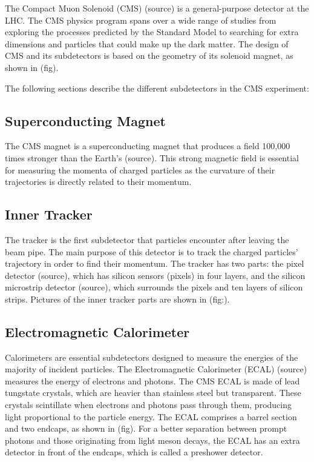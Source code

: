 The Compact Muon Solenoid (CMS) (source) is a general-purpose detector at the LHC. The CMS physics program spans over a wide range of studies from exploring the processes predicted by the Standard Model to searching for extra dimensions and particles that could make up the dark matter. The design of CMS and its subdetectors is based on the geometry of its solenoid magnet, as shown in (fig).

The following sections describe the different subdetectors in the CMS experiment:


\subsection{Superconducting Magnet}
The CMS magnet is a superconducting magnet that produces a field 100,000 times stronger than the Earth's (source). This strong magnetic field is essential for measuring the momenta of charged particles as the curvature of their trajectories is directly related to their momentum.

\subsection{Inner Tracker}
The tracker is the first subdetector that particles encounter after leaving the beam pipe.
The main purpose of this detector is to track the charged particles' trajectory in order to find their momentum.
The tracker has two parts: the pixel detector (source), which has silicon sensors (pixels) in four layers, and the silicon microstrip detector (source), which surrounds the pixels and ten layers of silicon strips. Pictures of the inner tracker parts are shown in (fig:).

\subsection{Electromagnetic Calorimeter}
Calorimeters are essential subdetectors designed to measure the energies of the majority of incident particles.
The Electromagnetic Calorimeter (ECAL) (source) measures the energy of electrons and photons.
The CMS ECAL is made of lead tungstate crystals, which are heavier than stainless steel but transparent.
These crystals scintillate when electrons and photons pass through them, producing light proportional to the particle energy.
The ECAL comprises a barrel section and two endcaps, as shown in (fig).
For a better separation between prompt photons and those originating from light meson decays, the ECAL has an extra detector in front of the endcaps, which is called a preshower detector.

